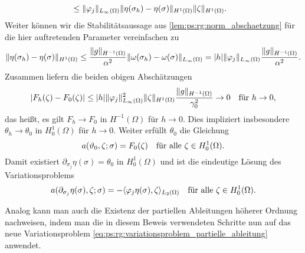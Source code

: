 \begin{Satz}
\begin{Beweis}
\begin{align}
            \\&\leq \norm{\varphi_{j}}_{L_{\infty}(\Omega)} \norm{\eta(\sigma_{h}) - \eta(\sigma)}_{H^{1}(\Omega)} \norm{\zeta}_{H^{1}(\Omega)}.
        \end{align}
        Weiter können wir die Stabilitätsaussage aus \cref{lem:ps:rg:norm_abschaetzung} für die hier auftretenden Parameter vereinfachen zu
        \begin{equation}
            \norm{\eta(\sigma_{h}) - \eta(\sigma)}_{H^{1}(\Omega)}
            \leq \frac{\norm{g}_{H^{-1}(\Omega)}}{\alpha^{2}} \norm{\omega(\sigma_{h}) - \omega(\sigma)}_{L_{\infty}(\Omega)}
            = \abs{h} \norm{\varphi_{j}}_{L_{\infty}(\Omega)} \frac{\norm{g}_{H^{-1}(\Omega)}}{\alpha^{2}}.
        \end{equation}
        Zusammen liefern die beiden obigen Abschätzungen
        \begin{equation}
            \abs{F_{h}(\zeta) - F_{0}(\zeta)} \leq \abs{h} \norm{\varphi_{j}}^{2}_{L_{\infty}(\Omega)} \norm{\zeta}_{H^{1}(\Omega)} \frac{\norm{g}_{H^{-1}(\Omega)}}{\gamma_{0}^{2}} \to 0 \quad \text{für}~h \to 0,
        \end{equation}
        das heißt, es gilt $F_{h} \to F_{0}$ in $H^{-1}(\Omega)$ für $h \to 0$.
        Dies impliziert insbesondere $\theta_{h} \to \theta_{0}$ in $H^{1}_{0}(\Omega)$ für $h \to 0$.
        Weiter erfüllt $\theta_{0}$ die Gleichung
        \begin{equation}
            a(\theta_{0}, \zeta; \sigma) = F_{0}(\zeta) \quad \fa \zeta \in H^{1}_{0}(\Omega).
        \end{equation}
        Damit existiert $\partial_{\sigma_{j}} \eta(\sigma) = \theta_{0}$ in $H^{1}_{0}(\Omega)$ und ist die eindeutige Lösung des Variationsproblems
        \begin{equation}
        \label{eq:ps:rg:variationsproblem_partielle_ableitung}
            a(\partial_{\sigma_{j}} \eta(\sigma), \zeta; \sigma) = - \skp{\varphi_{j} \eta(\sigma)}{\zeta}{L_{2}(\Omega)} \quad \fa \zeta \in H^{1}_{0}(\Omega).
        \end{equation}

        Analog kann man auch die Existenz der partiellen Ableitungen höherer Ordnung nachweisen, indem man die in diesem Beweis verwendeten Schritte nun auf das neue Variationsproblem \cref{eq:ps:rg:variationsproblem_partielle_ableitung} anwendet.
    \end{Beweis}
\end{Satz}

